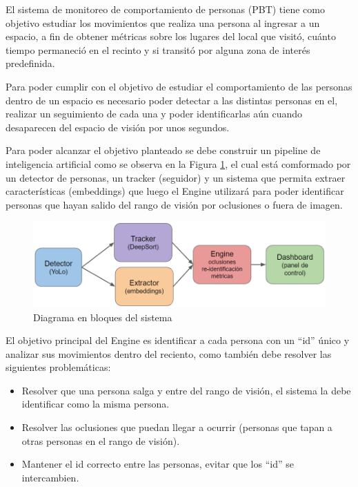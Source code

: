 \documentclass[11pt]{charter}
\begin{document}
El sistema de monitoreo de comportamiento de personas (PBT) tiene como objetivo estudiar los movimientos que realiza una persona al ingresar a un espacio, a fin de obtener métricas sobre los lugares del local que visitó, cuánto tiempo permaneció en el recinto y si transitó por alguna zona de interés predefinida.

Para poder cumplir con el objetivo de estudiar el comportamiento de las personas dentro de un espacio es necesario poder detectar a las distintas personas en el, realizar un seguimiento de cada una y poder identificarlas aún cuando desaparecen del espacio de visión por unos segundos.

Para poder alcanzar el objetivo planteado se debe construir un pipeline de inteligencia artificial como se observa en la Figura \ref{fig:diagBloques}, el cual está comformado por un detector de personas, un tracker (seguidor) y un sistema que permita extraer características (embeddings) que luego el Engine utilizará para poder identificar personas que hayan salido del rango de visión por oclusiones o fuera de imagen.

\vspace{25px}

\begin{figure}[htpb]
\centering 
\includegraphics[width=.7\textwidth]{./Figuras/diagBloques.png}
\caption{Diagrama en bloques del sistema}
\label{fig:diagBloques}
\end{figure}

El objetivo principal del Engine es identificar a cada persona con un “id” único y analizar sus movimientos dentro del reciento, como también debe resolver las siguientes problemáticas:
\begin{itemize}
\item Resolver que una persona salga y entre del rango de visión, el sistema la debe identificar como la misma persona.
\item Resolver las oclusiones que puedan llegar a ocurrir (personas que tapan a otras personas en el rango de visión).
\item Mantener el id correcto entre las personas, evitar que los “id” se intercambien.
\end{itemize}
\end{document}
